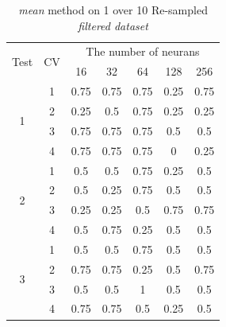 \documentclass[draft,dvipsnames]{drexel-thesis}
\begin{document}
\begin{thesis}
\begin{table}[!t]
\centering
\caption{{\em mean} method on 1 over 10 Re-sampled {\em filtered dataset}}
\label{tbl:mean_1_10}
\begin{tabular}{|c|c|c|c|c|c|c|}
\hline
\multirow{2}{*}{Test} & \multirow{2}{*}{CV} & \multicolumn{5}{c|}{The number of neurans}                               \\ \cline{3-7}
                      &                     & 16           & 32           & 64           & 128          & 256          \\ \hline
\multirow{4}{*}{1}    & 1                   & 0.75         & 0.75         & 0.75         & 0.25         & 0.75         \\ \cline{2-7}
                      & 2                   & 0.25         & 0.5          & 0.75         & 0.25         & 0.25         \\ \cline{2-7}
                      & 3                   & 0.75         & 0.75         & 0.75         & 0.5          & 0.5          \\ \cline{2-7}
                      & 4                   & 0.75         & 0.75         & 0.75         & 0            & 0.25         \\ \hline
\multirow{4}{*}{2}    & 1                   & 0.5          & 0.5          & 0.75         & 0.25         & 0.5          \\ \cline{2-7}
                      & 2                   & 0.5          & 0.25         & 0.75         & 0.5          & 0.5          \\ \cline{2-7}
                      & 3                   & 0.25         & 0.25         & 0.5          & 0.75         & 0.75         \\ \cline{2-7}
                      & 4                   & 0.5          & 0.75         & 0.25         & 0.5          & 0.5          \\ \hline
\multirow{4}{*}{3}    & 1                   & 0.5          & 0.5          & 0.75         & 0.5          & 0.5          \\ \cline{2-7}
                      & 2                   & 0.75         & 0.75         & 0.25         & 0.5          & 0.75         \\ \cline{2-7}
                      & 3                   & 0.5          & 0.5          & 1            & 0.5          & 0.5          \\ \cline{2-7}
                      & 4                   & 0.75         & 0.75         & 0.5          & 0.25         & 0.5          \\ \hline

\end{tabular}
\end{table}
\end{thesis}
\end{document}
